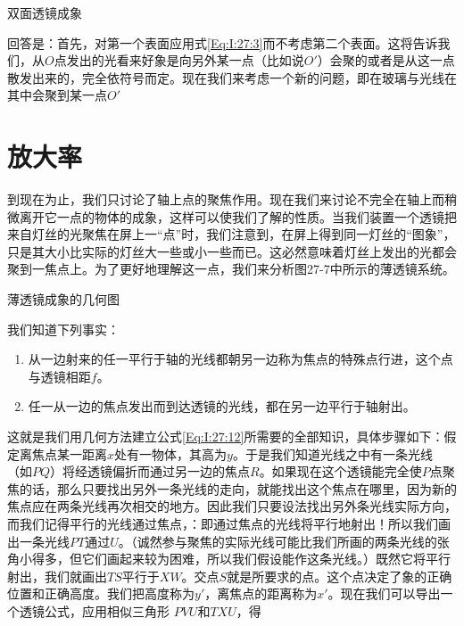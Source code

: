 \documentclass[12pt,oneside]{book}
\begin{document}
\begin{common-format}
\begin{fig}{双面透镜成象}
\label{fig:双面透镜成象}
\end{fig}

回答是：首先，对第一个表面应用式\ref{Eq:I:27:3}而不考虑第二个表面。这将告诉我们，从$ O $点发出的光看来好象是向另外某一点（比如说$ O' $）会聚的或者是从这一点散发出来的，完全依符号而定。现在我们来考虑一个新的问题，即在玻璃与光线在其中会聚到某一点$ O' $

\section{放大率}
到现在为止，我们只讨论了轴上点的聚焦作用。现在我们来讨论不完全在轴上而稍微离开它一点的物体的成象，这样可以使我们了解的性质。当我们装置一个透镜把来自灯丝的光聚焦在屏上一“点”时，我们注意到，在屏上得到同一灯丝的“图象”，只是其大小比实际的灯丝大一些或小一些而已。这必然意味着灯丝上发出的光都会聚到一焦点上。为了更好地理解这一点，我们来分析图27-7中所示的薄透镜系统。

\begin{fig}{薄透镜成象的几何图}
\label{fig:薄透镜成象的几何图}
\end{fig}

我们知道下列事实：
\begin{enumerate}
\renewcommand{\labelenumi}{(\arabic{enumi})}
\item 从一边射来的任一平行于轴的光线都朝另一边称为焦点的特殊点行进，这个点与透镜相距$ f $。
\item 任一从一边的焦点发出而到达透镜的光线，都在另一边平行于轴射出。
\end{enumerate}

这就是我们用几何方法建立公式\ref{Eq:I:27:12}所需要的全部知识，具体步骤如下：假定离焦点某一距离$ x $处有一物体，其高为$ y $。于是我们知道光线之中有一条光线（如$ PQ $）将经透镜偏折而通过另一边的焦点$ R $。如果现在这个透镜能完全使$ P $点聚焦的话，那么只要找出另外一条光线的走向，就能找出这个焦点在哪里，因为新的焦点应在两条光线再次相交的地方。因此我们只要设法找出另外条光线实际方向，而我们记得平行的光线通过焦点，：即通过焦点的光线将平行地射出！所以我们画出一条光线$ PT $通过$ U $。（诚然参与聚焦的实际光线可能比我们所画的两条光线的张角小得多，但它们画起来较为困难，所以我们假设能作这条光线。）既然它将平行射出，我们就画出$ TS $平行于$ XW $。交点$ S $就是所要求的点。这个点决定了象的正确位置和正确高度。我们把高度称为$ y' $，离焦点的距离称为$ x' $。现在我们可以导出一个透镜公式，应用相似三角形 $  PVU $和$  TXU $，得


\end{common-format}
\end{document}
